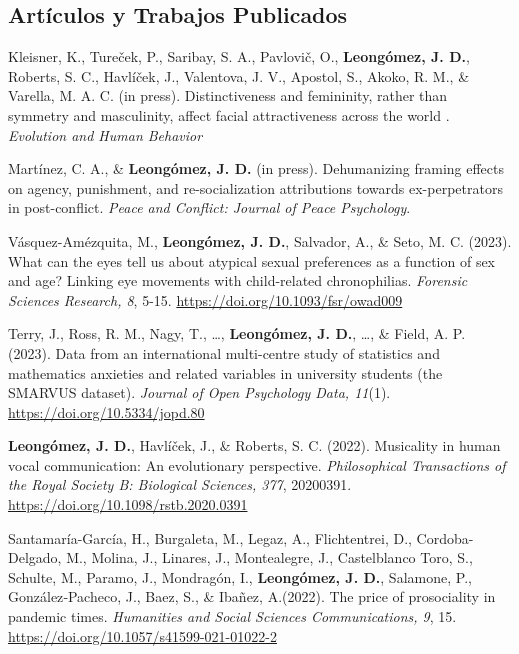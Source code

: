 \documentclass[11pt,a4paper,]{awesome-cv}
\begin{document}
\hypertarget{section}{%
\subsection{\texorpdfstring{\textbf{Artículos y Trabajos Publicados}}{}}\label{section}}

\begingroup
\footnotesize
\setlength{\parindent}{-0.5in}
\setlength{\leftskip}{0.5in}

Kleisner, K., Tureček, P., Saribay, S. A., Pavlovič, O.,
\textbf{Leongómez, J. D.}, Roberts, S. C., Havlíček, J., Valentova, J.
V., Apostol, S., Akoko, R. M., \& Varella, M. A. C. (in press).
Distinctiveness and femininity, rather than symmetry and masculinity,
affect facial attractiveness across the world . \emph{Evolution and
Human Behavior}

Martínez, C. A., \& \textbf{Leongómez, J. D.} (in press). Dehumanizing
framing effects on agency, punishment, and re-socialization attributions
towards ex-perpetrators in post-conflict. \emph{Peace and Conflict:
Journal of Peace Psychology}.

Vásquez-Amézquita, M., \textbf{Leongómez, J. D.}, Salvador, A., \& Seto,
M. C. (2023). What can the eyes tell us about atypical sexual
preferences as a function of sex and age? Linking eye movements with
child-related chronophilias. \emph{Forensic Sciences Research, 8}, 5-15.
\url{https://doi.org/10.1093/fsr/owad009}

Terry, J., Ross, R. M., Nagy, T., \ldots, \textbf{Leongómez, J. D.},
\ldots, \& Field, A. P. (2023). Data from an international multi-centre
study of statistics and mathematics anxieties and related variables in
university students (the SMARVUS dataset). \emph{Journal of Open
Psychology Data, 11}(1). \url{https://doi.org/10.5334/jopd.80}

\textbf{Leongómez, J. D.}, Havlíček, J., \& Roberts, S. C. (2022).
Musicality in human vocal communication: An evolutionary perspective.
\emph{Philosophical Transactions of the Royal Society B: Biological
Sciences, 377}, 20200391. \url{https://doi.org/10.1098/rstb.2020.0391}

Santamaría-García, H., Burgaleta, M., Legaz, A., Flichtentrei, D.,
Cordoba-Delgado, M., Molina, J., Linares, J., Montealegre, J.,
Castelblanco Toro, S., Schulte, M., Paramo, J., Mondragón, I.,
\textbf{Leongómez, J. D.}, Salamone, P., González‑Pacheco, J., Baez, S.,
\& Ibañez, A.(2022). The price of prosociality in pandemic times.
\emph{Humanities and Social Sciences Communications, 9}, 15.
\url{https://doi.org/10.1057/s41599-021-01022-2}
\end{document}
